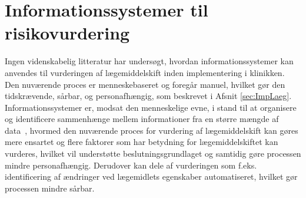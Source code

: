 
\section{Informationssystemer til risikovurdering} \label{sec:Inform_Risk}

Ingen videnskabelig litteratur har undersøgt, hvordan informationssystemer kan anvendes til vurderingen af lægemiddelskift inden implementering i klinikken. Den nuværende proces er menneskebaseret og foregår manuel, hvilket gør den tidskrævende, sårbar, og personafhængig, som beskrevet i Afsnit \ref{sec:ImpLaeg}. Informationssystemer er, modsat den menneskelige evne, i stand til at organisere og identificere sammenhænge mellem informationer fra en større mængde af data~\citep{Agrawal2009}, hvormed den nuværende proces for vurdering af lægemiddelskift kan gøres mere ensartet og flere faktorer som har betydning for lægemiddelskiftet kan vurderes, hvilket vil understøtte beslutningsgrundlaget og samtidig gøre processen mindre personafhængig. Derudover kan dele af vurderingen som f.eks. identificering af ændringer ved lægemidlets egenskaber automatiseret, hvilket gør processen mindre sårbar. 

